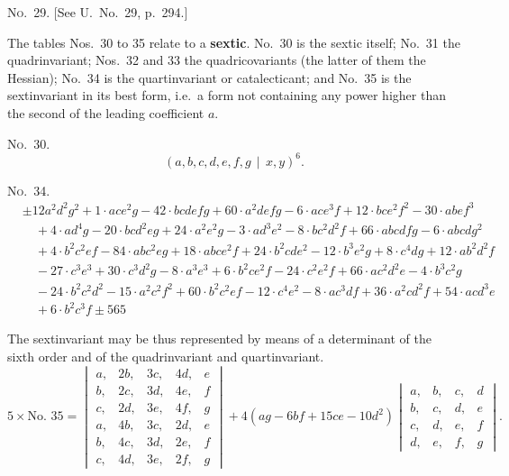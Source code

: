\documentclass[11pt,a4paper]{book}
\begin{document}
\begin{center}
\noindent\textsc{No.~29.} [See U.\ No.~29, p.~294.]

The tables Nos.~30 to 35 relate to a \textbf{sextic}.
No.~30 is the sextic itself; No.~31 the quadrinvariant; Nos.~32 and 33 the quadricovariants
(the latter of them the Hessian); No.~34 is the quartinvariant or catalecticant;
and No.~35 is the sextinvariant in its best form, i.e.\ a form not containing any
power higher than the second of the leading coefficient $a$.

\noindent\textsc{No.~30.}
\[(a, b, c, d, e, f, g \, \mid\, x, y)^6.\]

\noindent\textsc{No.~34.}
\begin{align*}
&\pm 12 a^2d^2g^2 + 1\cdot ace^2g - 42\cdot bcdefg + 60\cdot a^2defg - 6\cdot ace^3f + 12\cdot bce^2f^2 - 30\cdot abef^3\\
&\quad + 4\cdot ad^4g - 20\cdot bcd^2eg + 24\cdot a^2e^2g - 3\cdot ad^3e^2 - 8\cdot bc^2d^2f + 66\cdot abcdfg - 6\cdot abcdg^2\\
&\quad + 4\cdot b^2c^2ef - 84\cdot abc^2eg + 18\cdot abce^2f + 24\cdot b^2cde^2 - 12\cdot b^3e^2g + 8\cdot c^4dg + 12\cdot ab^2d^2f\\
&\quad - 27\cdot c^3e^3 + 30\cdot c^3d^2g - 8\cdot a^3e^3 + 6\cdot b^2ce^2f - 24\cdot c^2e^2f + 66\cdot ac^2d^2e - 4\cdot b^3c^2g\\
&\quad - 24\cdot b^2c^2d^2 - 15\cdot a^2c^2f^2 + 60\cdot b^2c^2ef - 12\cdot c^4e^2 - 8\cdot ac^3df + 36\cdot a^2cd^2f + 54\cdot acd^3e\\
&\quad + 6\cdot b^2c^3f \pm 565
\end{align*}

The sextinvariant may be thus represented by means of a determinant of the
sixth order and of the quadrinvariant and quartinvariant.
\[5 \times \text{No.~35} =
\begin{vmatrix}
a, & 2b, & 3c, & 4d, & e \\
b, & 2c, & 3d, & 4e, & f \\
c, & 2d, & 3e, & 4f, & g \\
a, & 4b, & 3c, & 2d, & e \\
b, & 4c, & 3d, & 2e, & f \\
c, & 4d, & 3e, & 2f, & g
\end{vmatrix}
+ 4(ag - 6bf + 15ce - 10d^2)
\begin{vmatrix}
a, & b, & c, & d \\
b, & c, & d, & e \\
c, & d, & e, & f \\
d, & e, & f, & g
\end{vmatrix}.\]


\end{center}
\end{document}
